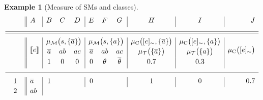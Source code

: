 \documentclass{tlp}
\newtheorem{example}{Example}
\newcommand{\at}[1]{\ensuremath{\!\del{#1}}}        %
\newcommand{\cla}[1]{\ensuremath{{\cal #1}}}        %
\newcommand{\co}[1]{\ensuremath{\overline{#1}}}     %
\newcommand{\TCHOICEset}{\ensuremath{\cla{T}}}
\newcommand{\MODELset}{\ensuremath{\cla{M}}}
\newcommand{\pwT}{\ensuremath{\mu_{\TCHOICEset}}}
\newcommand{\pwt}[1]{\ensuremath{\pwT\at{#1}}}
\newcommand{\pwM}{\ensuremath{\mu_{\MODELset}}}
\newcommand{\pwm}[1]{\ensuremath{\pwM\at{#1}}}
\newcommand{\pwC}{\ensuremath{\mu_{\textrm{C}}}}
\newcommand{\pwc}[1]{\ensuremath{\pwC\at{#1}}}
\newcommand{\stablecore}[1]{\ensuremath{\left\llbracket #1 \right\rrbracket}}
\newcommand{\class}[1]{\ensuremath{[{#1}]_{\sim}}}
\newcommand{\franc}[1]{{\color{green!30!black}#1}}
\begin{document}
\franc{
  \begin{example}[Measure of \aclp{SM} and classes]\label{ex:measures.sm}\em
      \begin{equation*}
          \begin{array}{c||l|ccc|ccc|c|c|r}
                &
              A & B                                         & C      & D           & E & F & G & H & I & J
              \\[3pt]
              \hline
              \hline
              \multirow{3}{*}{\phantom{2em}}
                & \multirow{3}{*}{\stablecore{e}}
                & \multicolumn{3}{c|}{\pwm{s,\set{\co{a}}}}
                & \multicolumn{3}{c|}{\pwm{s,\set{a}}}
                & \pwc{\class{e},\set{\co{a}}}
                & \pwc{\class{e},\set{a}}
                & \multirow{3}{*}{\pwc{\class{e}}}
              \\[2pt]
                &
                & \co{a}                                    & ab     & ac
                & \co{a}                                    & ab     & ac
                & \pwt{\set{\co{a}}}
                & \pwt{\set{a}}
                &
              \\[2pt]
                &
                & 1                                         & 0      & 0
                & 0                                         & \theta & \co{\theta}
                & 0.7
                & 0.3
                &
              \\[3pt]
              \hline
              1
                & \co{a}
                & 1                                         &        &
                & 0                                         &        &
                & 1
                & 0
                & 0.7
              \\[2pt]
              2
                & ab

\end{array}
\end{equation*}
\end{example}}
\end{document}
